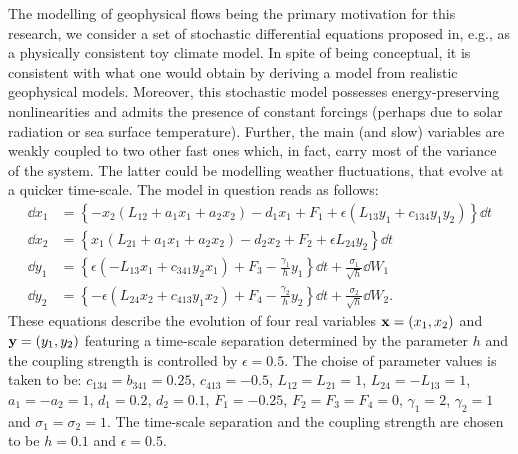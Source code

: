 \documentclass[12pt]{article}
\begin{document}
The modelling of geophysical flows being the primary motivation for this research, we consider a set of stochastic differential equations proposed in, e.g., \cite{Franzke2007} as a physically consistent toy climate model. In spite of being conceptual, it is consistent with what one would obtain by deriving a model from realistic geophysical models. Moreover, this stochastic model possesses energy-preserving nonlinearities and admits the presence of constant forcings (perhaps due to solar radiation or sea surface temperature). Further, the main (and slow) variables are weakly coupled to two other fast ones which, in fact, carry most of the variance of the system. The latter could be modelling weather fluctuations, that evolve at a quicker time-scale. The model in question reads as follows:
\begin{align}\label{stochastic model 1}
	\dd x_1 &= \left\lbrace -x_2\left( L_{12} + a_1x_1 + a_2x_2\right) -d_1x_1 +F_1 + \epsilon\left(L_{13}y_1+c_{134}y_1y_2\right)\right\rbrace \dd t \\\label{stochastic model 2} \dd x_2 &=  \left\lbrace x_1\left( L_{21} + a_1x_1 + a_2x_2 \right) -d_2x_2 +F_2 + \epsilon L_{24}y_2  \right\rbrace \dd t \\\label{stochastic model 3} \dd y_1 &= \left \lbrace \epsilon \left(-L_{13}x_1 + c_{341}y_2x_1\right) + F_3 - \frac{\gamma_1}{h}y_1  \right\rbrace \dd t +\frac{\sigma _1}{\sqrt{h}}\dd W_1 \\ \label{stochastic model 4} \dd y_2 &= \left\lbrace -\epsilon \left(L_{24}x_2 + c_{413}y_1x_2\right) +F_4 - \frac{\gamma_2}{h}y_2 \right \rbrace \dd t + \frac{\sigma_2}{\sqrt{h}}\dd W_2.
\end{align}
These equations describe the evolution of four real variables $\mathbf{x}=(x_1,x_2)$ and $\mathbf{y}=(y_1,y_2)$ featuring a time-scale separation determined by the parameter $h$ and the coupling strength is controlled by $\epsilon = 0.5$. The choise of parameter values is taken to be: $c_{134}=b_{341}=0.25$, $c_{413}=-0.5$, $L_{12}=L_{21}=1$, $L_{24}=-L_{13}=1$,$a_1=-a_2=1$, $d_1=0.2$, $d_2=0.1$, $F_1=-0.25$, $F_2=F_3=F_4=0$, $\gamma _1 = 2 $, $\gamma _2 = 1$ and $\sigma _1 = \sigma _2 = 1$. The time-scale separation and the coupling strength are chosen to be $h=0.1$ and $\epsilon= 0.5$.
\end{document}
